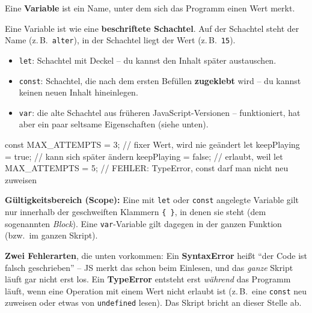 \documentclass[a4paper,11pt]{article}
\begin{document}
Eine \textbf{Variable} ist ein Name, unter dem sich das Programm einen Wert merkt.

\begin{analogie}
Eine Variable ist wie eine \textbf{beschriftete Schachtel}. Auf der Schachtel steht der Name (z.\,B.\ \texttt{alter}),
in der Schachtel liegt der Wert (z.\,B.\ \texttt{15}).
\begin{itemize}[nosep]
\item \texttt{let}: Schachtel mit Deckel -- du kannst den Inhalt später austauschen.
\item \texttt{const}: Schachtel, die nach dem ersten Befüllen \textbf{zugeklebt} wird -- du kannst keinen neuen
      Inhalt hineinlegen.
\item \texttt{var}: die alte Schachtel aus früheren JavaScript-Versionen -- funktioniert, hat aber ein paar
      seltsame Eigenschaften (siehe unten).
\end{itemize}
\end{analogie}

\begin{code}
const MAX_ATTEMPTS = 3;   // fixer Wert, wird nie geändert
let keepPlaying = true;   // kann sich später ändern
keepPlaying = false;      // erlaubt, weil let
MAX_ATTEMPTS = 5;         // FEHLER: TypeError, const darf man nicht neu zuweisen
\end{code}

\textbf{Gültigkeitsbereich (Scope):} Eine mit \texttt{let} oder \texttt{const} angelegte Variable gilt nur innerhalb
der geschweiften Klammern \texttt{\{ \}}, in denen sie steht (dem sogenannten \emph{Block}). Eine \texttt{var}-Variable
gilt dagegen in der ganzen Funktion (bzw.\ im ganzen Skript).

\textbf{Zwei Fehlerarten}, die unten vorkommen: Ein \textbf{SyntaxError} heißt "`der Code ist falsch
geschrieben"' -- JS merkt das schon beim Einlesen, und das \emph{ganze} Skript läuft gar nicht erst los. Ein
\textbf{TypeError} entsteht erst \emph{während} das Programm läuft, wenn eine Operation mit einem Wert nicht
erlaubt ist (z.\,B.\ eine \texttt{const} neu zuweisen oder etwas von \texttt{undefined} lesen). Das Skript bricht an
dieser Stelle ab.
\end{document}
